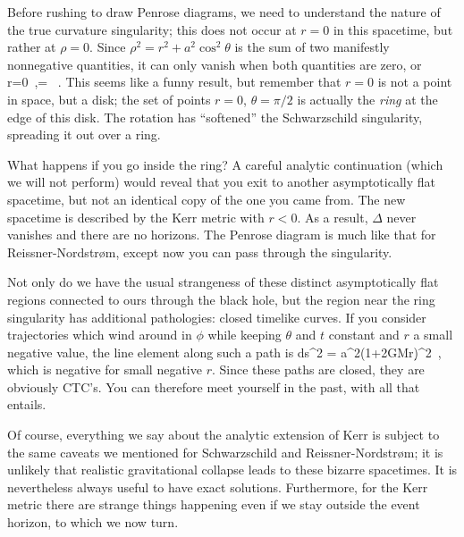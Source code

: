 Before rushing to draw Penrose diagrams, we need to understand the
nature of the true curvature singularity; this does not occur at
$r=0$ in this spacetime, but rather at $\rho=0$.  Since $\rho^2
= r^2+a^2\cos^2\theta$ is the sum of two manifestly nonnegative
quantities, it can only vanish when both quantities are zero, or
\be
  r=0\ ,\qquad \theta = {\pi{}}\ .\label{7.129}
\ee
This seems like a funny result, but remember that $r=0$ is not
a point in space, but a disk; the set of points $r=0$, $\theta=\pi/2$
is actually the {\it ring} at the edge of this disk.  The rotation
has ``softened'' the Schwarzschild singularity, spreading it out
over a ring.

What happens if you go inside the ring?  A careful analytic
continuation (which we will not perform) would reveal that you
exit to another asymptotically flat spacetime, but not an identical
copy of the one you came from.  The new spacetime is described
by the Kerr metric with $r<0$.  As a result, $\Delta$ never vanishes
and there are no horizons.  The Penrose diagram is much like that for
Reissner-Nordstr{\o}m, except now you can pass through the singularity.

\begin{figure}[p]
  \centerline{
  }
\end{figure}

Not only do we have the usual strangeness of these distinct 
asymptotically flat regions connected to ours through the black
hole, but the region near the ring singularity has additional
pathologies: closed timelike curves.  If you consider trajectories
which wind around in $\phi$ while keeping $\theta$ and $t$
constant and $r$ a small negative value, the line element along such
a path is
\be
  ds^2 = a^2\left(1+{{2GM}\over r}\right)\d\phi^2\ ,\label{7.130}
\ee
which is negative for small negative $r$.  Since these paths are
closed, they are obviously CTC's.  You can therefore meet yourself
in the past, with all that entails.

Of course, everything we say about the analytic extension of Kerr
is subject to the same caveats we mentioned for Schwarzschild and
Reissner-Nordstr{\o}m; it is unlikely that realistic gravitational
collapse leads to these bizarre spacetimes.  It is nevertheless always
useful to have exact solutions.  Furthermore, for the Kerr metric
there are strange things happening even if we stay outside the
event horizon, to which we now turn.

